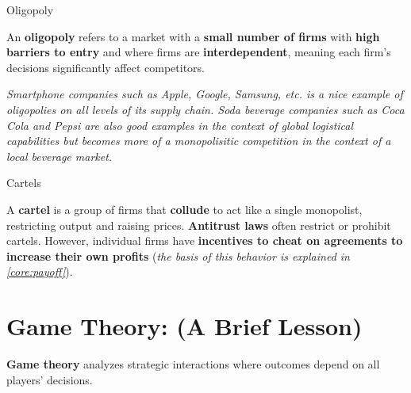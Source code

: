 \documentclass[10pt]{article}
\begin{document}
    \begin{core}{Oligopoly}

      An \textbf{oligopoly} refers to a market with a \textbf{small number of firms} with \textbf{high barriers to entry} and where firms are \textbf{interdependent}, meaning each firm's decisions significantly affect competitors.

      \textit{Smartphone companies such as Apple, Google, Samsung, etc. is a nice example of oligopolies on all levels of its supply chain. Soda beverage companies such as Coca Cola and Pepsi are also good examples in the context of global logistical capabilities but becomes more of a monopolisitic competition in the context of a local beverage market.}

    \end{core}

    \begin{core}{Cartels}

      A \textbf{cartel} is a group of firms that \textbf{collude} to act like a single monopolist, restricting output and raising prices. \textbf{Antitrust laws} often restrict or prohibit cartels. However, individual firms have \textbf{incentives to cheat on agreements to increase their own profits} (\textit{the basis of this behavior is explained in \autoref{core:payoff}}).

    \end{core}

\section{Game Theory: (A Brief Lesson)}

  \textbf{Game theory} analyzes strategic interactions where outcomes depend on all players' decisions.
\end{document}
